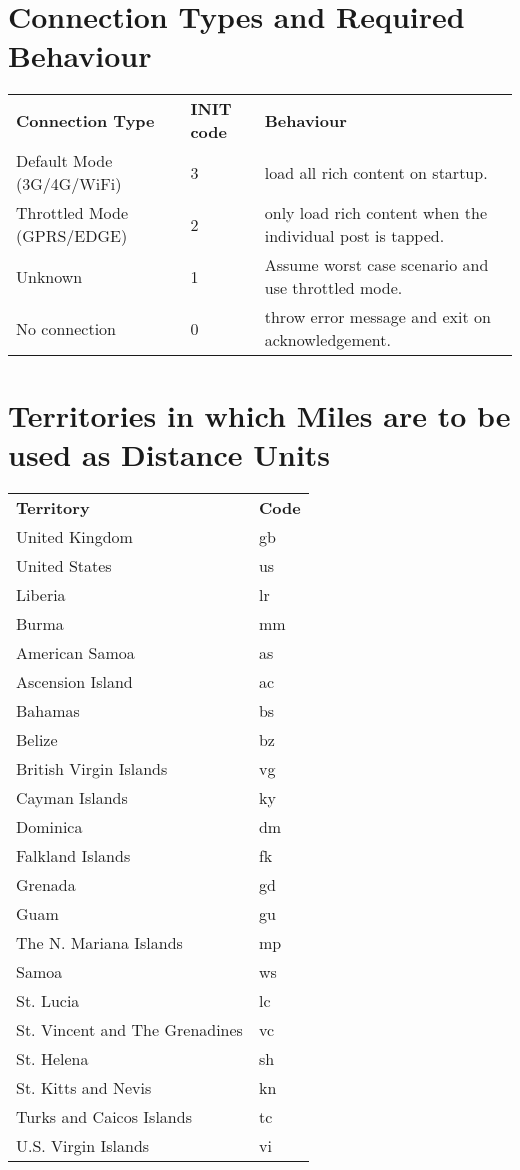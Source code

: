 \documentclass[12pt, a4paper]{article}
\begin{document}
\begin{appendices}
\section{Connection Types and Required Behaviour}
\begin{table}[ht]
\centering
\label{my-label}
\begin{tabular}{lll}
\textbf{Connection Type} & \textbf{INIT code} & \textbf{Behaviour}\\
Default Mode (3G/4G/WiFi) & 3 & load all rich content on startup.\\
Throttled Mode (GPRS/EDGE) & 2 & only load rich content when the individual post is tapped.\\
Unknown & 1 & Assume worst case scenario and use throttled mode.\\
No connection & 0 & throw error message and exit on acknowledgement.\\
\end{tabular}
\end{table}
\section{Territories in which Miles are to be used as Distance Units}
\begin{table}[ht]
\centering
\label{my-label}
\begin{tabular}{ll}
\textbf{Territory} & \textbf{Code}\\
United Kingdom & gb\\
United States & us\\
Liberia & lr\\
Burma & mm\\
American Samoa & as\\
Ascension Island & ac\\
Bahamas & bs\\
Belize & bz\\
British Virgin Islands & vg\\
Cayman Islands & ky\\
Dominica & dm\\
Falkland Islands & fk\\
Grenada & gd\\
Guam & gu\\
The N. Mariana Islands & mp\\
Samoa & ws\\
St. Lucia & lc\\
St. Vincent and The Grenadines & vc\\
St. Helena & sh\\
St. Kitts and Nevis & kn\\
Turks and Caicos Islands & tc\\
U.S. Virgin Islands & vi\\
\end{tabular}
\end{table}
\end{appendices}
\end{document}
